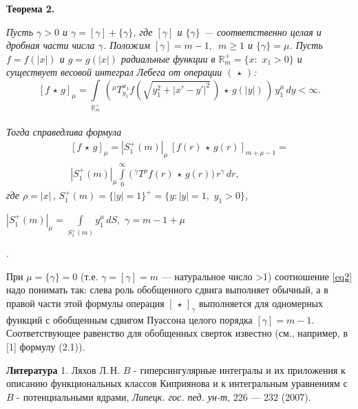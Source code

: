 {\bf Теорема 2.}  {\it    Пусть $\gamma{>}0$ и $\gamma=[\gamma]+\{\gamma\}$, где $[\gamma]$ и $\{\gamma\}$ --- соответственно целая и дробная части числа $\gamma$.
Положим $[\gamma]=m-1, \,\,\,m\ge1$ и $\{\gamma\}=\mu$. Пусть $f=f(|x|)$ и
$g=g(|x|)$ радиальные функции в $\mathbb{R}^+_m=\{x:\,\,x_1>0\}$ и существует весовой интеграл Лебега от операции $(\,\star\,)$:
$$
[f\,\star\,g]_\mu=\int\limits_{\mathbb{R}^+_m}\,\left(^\mu T^{x_1}_{y_1}f(\sqrt{y_1^2+
|x'-y'|^2}\,)\,\star\,g(|y|)\,\right)\,y_1^\mu\,dy<\infty.
$$ \\
Тогда справедлива формула
\begin{equation}\label{eq2}
\begin{array}{cccc}
[f\,\star\,g]_\mu=|S_1^+(m)|_\mu\, \left[f(r)\,\star\,g(r)\right]_{m+\mu-1} =\\
|S^+_1(m)|_\mu\int\limits_0^\infty \,\biggl(\,^\gamma T^\rho f(r)\,\star\,g(r)
\biggl)\,r^\gamma\,dr,
\end{array}
\end{equation}
где  $\rho=|x|\,, \,S^+_1(m){=}\{|y|{=}1\}^+{=}\{y:|y|{=}1,\,\,y_1>0\}$,

$
|S_1^+(m)|_\mu{=}\int\limits_{S_1^+(m)} y_1^\mu\,dS,$  $\gamma{=}m{-}1{+}\mu$}.

 При $\mu=\{\gamma\}=0$ (т.е. $\gamma=[\gamma]=m$ --- натуральное число >1) соотношение \eqref{eq2} надо понимать так:
 слева роль обобщенного сдвига выполняет обычный, а в правой части этой формулы операция $[\,\star\,]_\gamma$ выполняется для одномерных функций с обобщенным сдвигом Пуассона целого порядка $[\gamma]=m-1$. Соответствующее равенство для обобщенных сверток известно   (см., например,  в [1] формулу (2.1)).

{\bf Литература}
1. Ляхов Л.\,Н. $B$ - гиперсингулярные интегралы и их приложения к описанию функциональных классов Киприянова и к интегральным уравнениям с $B$ - потенциальными ядрами,  {\it Липецк. гос. пед. ун-т}, 226 --- 232 (2007).


